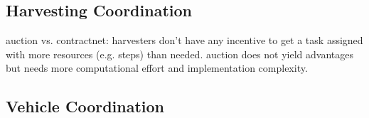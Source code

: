 \subsection{Harvesting Coordination}


auction vs. contractnet:
harvesters don't have any incentive to get a task assigned with more resources (e.g. steps) than needed. auction does not yield advantages but needs more computational effort and implementation complexity.

\subsection{Vehicle Coordination}